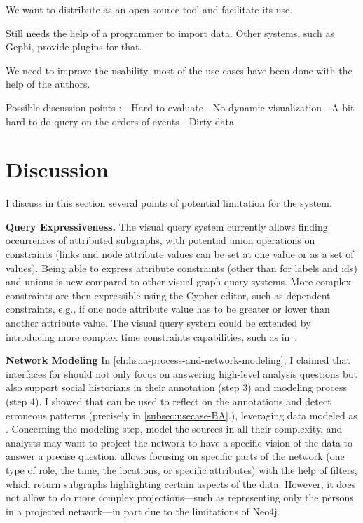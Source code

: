 We want to distribute \name as an open-source tool and facilitate its use.

Still needs the help of a programmer to import data. Other systems, such as Gephi, provide plugins for that.

 We need to improve the usability, most of the use cases have been done with the help of the authors.


Possible discussion points :
- Hard to evaluate
- No dynamic visualization
- A bit hard to do query on the orders of events
- Dirty data
\fi

\section{Discussion}

I discuss in this section several points of potential limitation for the system.

\noindent\textbf{Query Expressiveness.}
The visual query system currently allows finding occurrences of attributed subgraphs, with potential union operations on constraints (links and node attribute values can be set at one value or as a set of values). Being able to express attribute constraints (other than for labels and ids) and unions is new compared to other visual graph query systems.
More complex constraints are then expressible using the Cypher editor, such as dependent constraints, e.g., if one node attribute value has to be greater or lower than another attribute value.
The visual query system could be extended by introducing more complex time constraints capabilities, such as in~\cite{monroe2012exploring}.

\noindent\textbf{Network Modeling}
In \autoref{ch:hsna-process-and-network-modeling}, I claimed that \va interfaces for \hsna should not only focus on answering high-level analysis questions but also support social historians in their annotation (step 3) and modeling process (step 4).
I showed that \combinet can be used to reflect on the annotations and detect erroneous patterns (precisely in \autoref{subsec:usecase-BA}.), leveraging data modeled as \modelplural.
Concerning the modeling step, \modelplural model the sources in all their complexity, and analysts may want to project the network to have a specific vision of the data to answer a precise question.
\combinet allows focusing on specific parts of the network (one type of role, the time, the locations, or specific attributes) with the help of filters, which return subgraphs highlighting certain aspects of the data.
However, it does not allow to do more complex projections---such as representing only the persons in a projected network---in part due to the limitations of Neo4j\cite{neo4j}.

